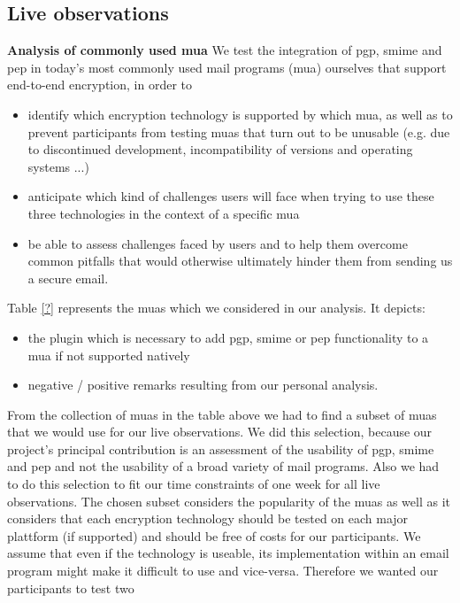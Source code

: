 \subsection{Live observations}
\textbf{Analysis of commonly used \acrlong{mua}}
We test the integration of \acrshort{pgp}, \acrshort{smime} and \acrshort{pep} in today's most commonly used mail programs (\acrshort{mua}) ourselves that support end-to-end encryption, in order to
\begin{itemize}
	\item identify which encryption technology is supported by which \acrshort{mua}, as well as to prevent participants from testing \acrshort{mua}s that turn out to be unusable (e.g. due to discontinued development, incompatibility of versions and operating systems ...)
	\item anticipate which kind of challenges users will face when trying to use these three	technologies in the context of a specific \acrshort{mua}
	\item be able to assess challenges faced by users and to help them overcome common pitfalls that would otherwise ultimately hinder them from sending us a secure \acrshort{email}.
\end{itemize}
Table \ref{?} represents the \acrlong{mua}s which we considered in our analysis. It depicts:
\begin{itemize}
	\item the plugin which is necessary to add \acrshort{pgp}, \acrshort{smime} or \acrshort{pep} functionality to a \acrshort{mua} if not	supported natively
	\item negative / positive remarks resulting from our personal analysis.
\end{itemize}
From the collection of \acrshort{mua}s in the table above we had to find a subset of \acrshort{mua}s that we would use for our live observations. We did this selection, because our project’s principal contribution is an assessment of the usability of \acrshort{pgp}, \acrshort{smime} and \acrshort{pep} and not the usability of a broad variety of mail programs. Also we had to do this selection to fit our time constraints of one week for all live observations. The chosen subset considers the popularity of the \acrshort{mua}s as well as it considers that each encryption technology should be tested on each major plattform (if supported) and should be free of costs for our participants. We assume that even if the technology is useable, its implementation within an \acrshort{email} program might make it difficult to use and vice-versa. Therefore we wanted our participants to test two
